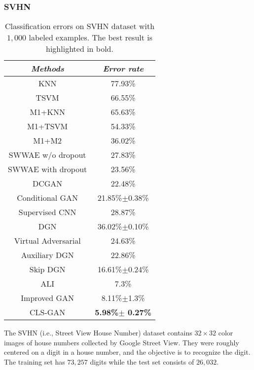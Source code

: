 \documentclass[11pt,fullpage, letterpaper,twoside]{article}
\newcommand{\1}[1]{\mathds{1}_{\left[#1\right]}}
\begin{document}
\subsubsection{SVHN}

\begin{table}[t]
\caption{Classification errors on SVHN dataset with $1,000$ labeled examples. The best result is highlighted in bold.}
\label{tab:svhn}
\begin{center}
\begin{tabular}{c||c}    \toprule
\emph{Methods} & \emph{Error rate} \\\midrule
KNN \cite{radford2015unsupervised}& 77.93\%\\
TSVM \cite{radford2015unsupervised}& 66.55\%\\
M1+KNN \cite{kingma2014semi}& 65.63\%\\
M1+TSVM \cite{kingma2014semi}& 54.33\%\\
M1+M2 \cite{kingma2014semi}& 36.02\%\\\midrule
SWWAE w/o dropout \cite{zhao2015stacked}& 27.83\%\\
SWWAE with dropout \cite{zhao2015stacked}& 23.56\%\\
DCGAN \cite{radford2015unsupervised}& 22.48\%\\
Conditional GAN \cite{mirza2014conditional}& 21.85\%$\pm$0.38\%\\
Supervised CNN \cite{radford2015unsupervised}& 28.87\%\\
DGN \cite{kingma2014semi} &36.02\%$\pm$0.10\%\\
Virtual Adversarial \cite{miyato2015distributional} &24.63\%\\
Auxiliary DGN \cite{maaloe2016auxiliary} &22.86\%\\
Skip DGN \cite{maaloe2016auxiliary}&16.61\%$\pm$0.24\%\\
ALI \cite{dumoulin2016adversarially} & 7.3\%\\
Improved GAN \cite{salimans2016improved}&8.11\%$\pm$1.3\%\\\midrule
CLS-GAN & {\bf 5.98\%$\pm$ 0.27\%}\\\bottomrule
\end{tabular}
\vspace{-2mm}
\end{center}
\end{table}

The SVHN (i.e., Street View House Number) dataset \cite{netzer2011reading} contains $32\times 32$ color images of house numbers collected by Google Street View. They were roughly centered on a digit in a house number, and the objective is to recognize the digit.  The training set has $73,257$ digits while the test set consists of $26,032$.
\end{document}
